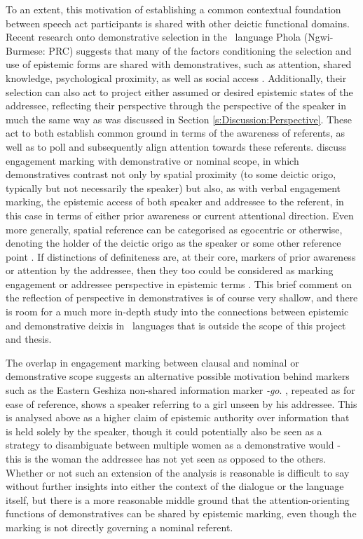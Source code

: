 To an extent, this motivation of establishing a common contextual foundation between speech act participants is shared with other deictic functional domains. Recent research onto demonstrative selection in the \lfam\ language Phola (Ngwi-Burmese: PRC) suggests that many of the factors conditioning the selection and use of epistemic forms are shared with demonstratives, such as attention, shared knowledge, psychological proximity, as well as social access \cite{GonzalezPerez2023}. Additionally, their selection can also act to project either assumed or desired epistemic states of the addressee, reflecting their perspective through the perspective of the speaker in much the same way as was discussed in Section \ref{s:Discussion:Perspective}. These act to both establish common ground in terms of the awareness of referents, as well as to poll and subsequently align attention towards these referents.  discuss engagement marking with demonstrative or nominal scope, in which demonstratives contrast not only by spatial proximity (to some deictic origo, typically but not necessarily the speaker) but also, as with verbal engagement marking, the epistemic access of both speaker and addressee to the referent, in this case in terms of either prior awareness or current attentional direction. Even more generally, spatial reference can be categorised as egocentric or otherwise, denoting the holder of the deictic origo as the speaker or some other reference point \cite{Diessel2014}. If distinctions of definiteness are, at their core, markers of prior awareness or attention by the addressee, then they too could be considered as marking engagement or addressee perspective in epistemic terms \cite[117]{EvansBergqvistSanRoque2018a}. This brief comment on the reflection of perspective in demonstratives is of course very shallow, and there is room for a much more in-depth study into the connections between epistemic and demonstrative deixis in \lfam\ languages that is outside the scope of this project and thesis.

The overlap in engagement marking between clausal and nominal or demonstrative scope suggests an alternative possible motivation behind markers such as the Eastern Geshiza non-shared information marker \textit{-go}. , repeated as  for ease of reference, shows a speaker referring to a girl unseen by his addressee. This is analysed above as a higher claim of epistemic authority over information that is held solely by the speaker, though it could potentially also be seen as a strategy to disambiguate between multiple women as a demonstrative would - this is the woman the addressee has not yet seen as opposed to the others. Whether or not such an extension of the analysis is reasonable is difficult to say without further insights into either the context of the dialogue or the language itself, but there is a more reasonable middle ground that the attention-orienting functions of demonstratives can be shared by epistemic marking, even though the marking is not directly governing a nominal referent.

